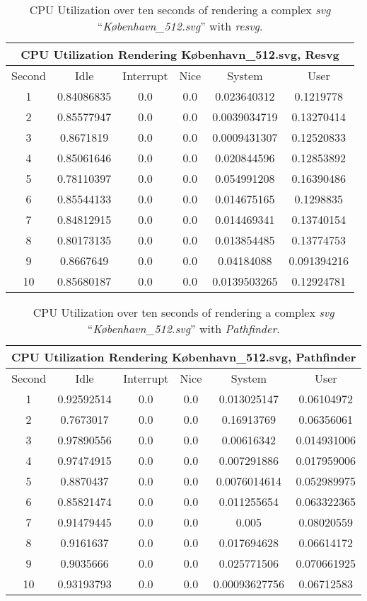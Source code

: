 \begin{table}[H]
\centering
\begin{tabular}{ |c|c|c|c|c|c| }
\hline
\multicolumn{6}{|c|}{CPU Utilization Rendering København\_512.svg, Resvg}\\
\hline
Second&Idle&Interrupt&Nice&System&User\\
\hline
1&0.84086835&0.0&0.0&0.023640312&0.1219778\\
\hline
2&0.85577947&0.0&0.0&0.0039034719&0.13270414\\
\hline
3&0.8671819&0.0&0.0&0.0009431307&0.12520833\\
\hline
4&0.85061646&0.0&0.0&0.020844596&0.12853892\\
\hline
5&0.78110397&0.0&0.0&0.054991208&0.16390486\\
\hline
6&0.85544133&0.0&0.0&0.014675165&0.1298835\\
\hline
7&0.84812915&0.0&0.0&0.014469341&0.13740154\\
\hline
8&0.80173135&0.0&0.0&0.013854485&0.13774753\\
\hline
9&0.8667649&0.0&0.0&0.04184088&0.091394216\\
\hline
10&0.85680187&0.0&0.0&0.0139503265&0.12924781\\
\hline
\end{tabular}
\caption{CPU Utilization over ten seconds of rendering a complex \textit{svg} ``\textit{København\_512.svg}'' with \textit{resvg}.\label{tab:wet_map_resvg}}
\end{table}

\begin{table}[H]
\centering
\begin{tabular}{ |c|c|c|c|c|c| }
\hline
\multicolumn{6}{|c|}{CPU Utilization Rendering København\_512.svg, Pathfinder}\\
\hline
Second&Idle&Interrupt&Nice&System&User\\
\hline
1&0.92592514&0.0&0.0&0.013025147&0.06104972\\
\hline
2&0.7673017&0.0&0.0&0.16913769&0.06356061\\
\hline
3&0.97890556&0.0&0.0&0.00616342&0.014931006\\
\hline
4&0.97474915&0.0&0.0&0.007291886&0.017959006\\
\hline
5&0.8870437&0.0&0.0&0.0076014614&0.052989975\\
\hline
6&0.85821474&0.0&0.0&0.011255654&0.063322365\\
\hline
7&0.91479445&0.0&0.0&0.005&0.08020559\\
\hline
8&0.9161637&0.0&0.0&0.017694628&0.06614172\\
\hline
9&0.9035666&0.0&0.0&0.025771506&0.070661925\\
\hline
10&0.93193793&0.0&0.0&0.00093627756&0.06712583\\
\hline
\end{tabular}
\caption{CPU Utilization over ten seconds of rendering a complex \textit{svg} ``\textit{København\_512.svg}'' with \textit{Pathfinder}.\label{tab:wet_map_pathfinder}}
\end{table}


